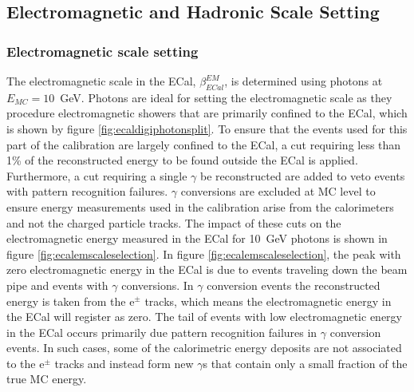 \subsection{Electromagnetic and Hadronic Scale Setting}
\label{sec:scalesetting}


\subsubsection{Electromagnetic scale setting}
\label{sec:emscalesetting}
The electromagnetic scale in the ECal, $\beta^{EM}_{ECal}$, is determined using photons at $E_{MC} = 10$~GeV.  Photons are ideal for setting the electromagnetic scale as they procedure electromagnetic showers that are primarily confined to the ECal, which is shown by figure \ref{fig:ecaldigiphotonsplit}.  To ensure that the events used for this part of the calibration are largely confined to the ECal, a cut requiring less than 1\% of the reconstructed energy to be found outside the ECal is applied.  Furthermore, a cut requiring a single $\gamma$ be reconstructed are added to veto events with pattern recognition failures.  $\gamma$ conversions are excluded at MC level to ensure energy measurements used in the calibration arise from the calorimeters and not the charged particle tracks.  The impact of these cuts on the electromagnetic energy measured in the ECal for 10~GeV photons is shown in figure \ref{fig:ecalemscaleselection}.  In figure \ref{fig:ecalemscaleselection}, the peak with zero electromagnetic energy in the ECal is due to events traveling down the beam pipe and events with $\gamma$ conversions.  In $\gamma$ conversion events the reconstructed energy is taken from the $\text{e}^{\pm}$ tracks, which means the electromagnetic energy in the ECal will register as zero.  The tail of events with low electromagnetic energy in the ECal occurs primarily due pattern recognition failures in $\gamma$ conversion events.  In such cases, some of the calorimetric energy deposits are not associated to the $\text{e}^{\pm}$ tracks and instead form new $\gamma$s that contain only a small fraction of the true MC energy.  

